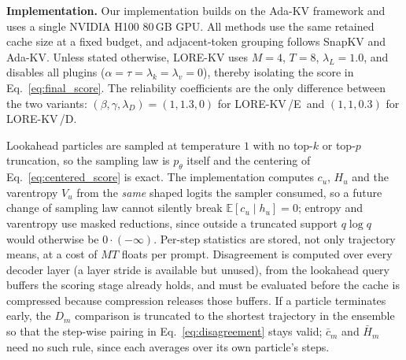 \documentclass{article} %
\newcommand{\lorekvE}{LORE-KV\,/E}
\newcommand{\lorekvD}{LORE-KV\,/D}
\begin{document}
\textbf{Implementation.}
Our implementation builds on the Ada-KV framework and uses a single NVIDIA H100 80\,GB GPU. All methods use the same retained cache size at a fixed budget, and adjacent-token grouping follows SnapKV and Ada-KV. Unless stated otherwise, LORE-KV uses $M{=}4$, $T{=}8$, $\lambda_L{=}1.0$, and disables all plugins
($\alpha{=}\tau{=}\lambda_k{=}\lambda_v{=}0$), thereby isolating the score in Eq.~\eqref{eq:final_score}. The reliability coefficients are the only difference between the two variants: $(\beta,\gamma,\lambda_D){=}(1,1.3,0)$ for \lorekvE\ and $(1,1,0.3)$ for \lorekvD.

Lookahead particles are sampled at temperature $1$ with no top-$k$ or top-$p$ truncation, so the sampling law is $p_\theta$ itself and the centering of Eq.~\eqref{eq:centered_score} is exact. The implementation computes $c_u$, $H_u$ and the varentropy $V_u$ from the \emph{same} shaped logits the sampler consumed, so a future change of sampling law cannot silently break $\mathbb{E}[c_u\mid h_u]=0$; entropy and varentropy use masked reductions, since outside a truncated support $q\log q$ would otherwise be $0\cdot(-\infty)$. Per-step statistics are stored, not only trajectory means, at a cost of $MT$ floats per prompt. Disagreement is computed over every decoder layer (a layer stride is available but unused), from the lookahead query buffers the scoring stage already holds, and must be evaluated before the cache is compressed because compression releases those buffers. If a particle terminates early, the $D_m$ comparison is truncated to the shortest trajectory in the ensemble so that the step-wise pairing in Eq.~\eqref{eq:disagreement} stays valid; $\bar c_m$ and $\bar H_m$ need no such rule, since each averages over its own particle's steps.
\end{document}

